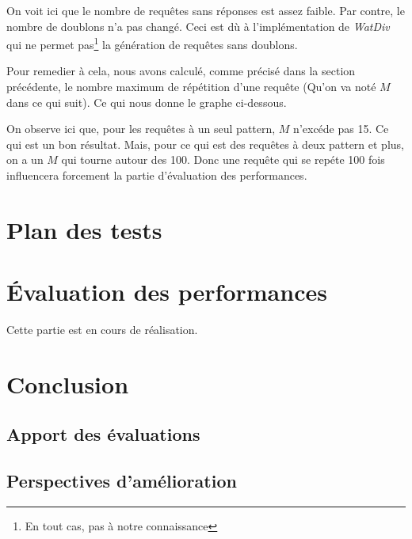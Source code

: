 \documentclass[12pt,titlepage]{article}
\begin{document}
On voit ici que le nombre de requêtes sans réponses est assez faible. Par contre, le nombre de doublons n'a pas changé. Ceci est dù à l'implémentation de \textit{WatDiv} qui ne permet pas\footnote{En tout cas, pas à notre connaissance} la génération de requêtes sans doublons.

Pour remedier à cela, nous avons calculé, comme précisé dans la section précédente, le nombre maximum de répétition d'une requête (Qu'on va noté $M$ dans ce qui suit). Ce qui nous donne le graphe ci-dessous.

\begin{figure}[!h]
  \centering
\end{figure}

On observe ici que, pour les requêtes à un seul pattern, $M$ n'excéde pas 15. Ce qui est un bon résultat. Mais, pour ce qui est des requêtes à deux pattern et plus, on a un $M$ qui tourne autour des 100. Donc une requête qui se repéte 100 fois influencera forcement la partie d'évaluation des performances.

\section{Plan des tests}

\section{Évaluation des performances}

Cette partie est en cours de réalisation.

\section{Conclusion}

\subsection{Apport des évaluations}

\subsection{Perspectives d'amélioration}
\end{document}
